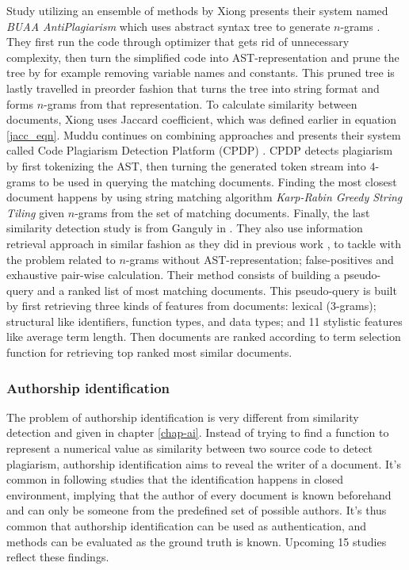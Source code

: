 Study utilizing an ensemble of methods by Xiong \etal presents their system named \textit{BUAA AntiPlagiarism} which uses abstract syntax tree to generate $n$-grams \cite{BUAA2009}. They first run the code through optimizer that gets rid of unnecessary complexity, then turn the simplified code into AST-representation and prune the tree by for example removing variable names and constants. This pruned tree is lastly travelled in preorder fashion that turns the tree into string format and forms $n$-grams from that representation. To calculate similarity between documents, Xiong \etal uses Jaccard coefficient, which was defined earlier in equation \ref{jacc_eqn}. Muddu \etal continues on combining approaches and presents their system called Code Plagiarism Detection Platform (CPDP) \cite{CPDPPD2013}. CPDP detects plagiarism by first tokenizing the AST, then turning the generated token stream into $4$-grams to be used in querying the matching documents. Finding the most closest document happens by using string matching algorithm \emph{Karp-Rabin Greedy String Tiling} given $n$-grams from the set of matching documents. Finally, the last similarity detection study is from Ganguly \etal in \cite{RCISCP2017}. They also use information retrieval approach in similar fashion as they did in previous work \cite{AIR2015}, to tackle with the problem related to $n$-grams without AST-representation; false-positives and exhaustive pair-wise calculation. Their method consists of building a pseudo-query and a ranked list of most matching documents. This pseudo-query is built by first retrieving three kinds of features from documents: lexical (3-grams); structural like identifiers, function types, and data types; and 11 stylistic features like average term length. Then documents are ranked according to term selection function for retrieving top ranked most similar documents. 

\subsubsection{Authorship identification}
The problem of authorship identification is very different from similarity detection and given in chapter \ref{chap-ai}. Instead of trying to find a function to represent a numerical value as similarity between two source code to detect plagiarism, authorship identification aims to reveal the writer of a document. It's common in following studies that the identification happens in closed environment, implying that the author of every document is known beforehand and can only be someone from the predefined set of possible authors. It's thus common that authorship identification can be used as authentication, and methods can be evaluated as the ground truth is known. Upcoming 15 studies reflect these findings.


